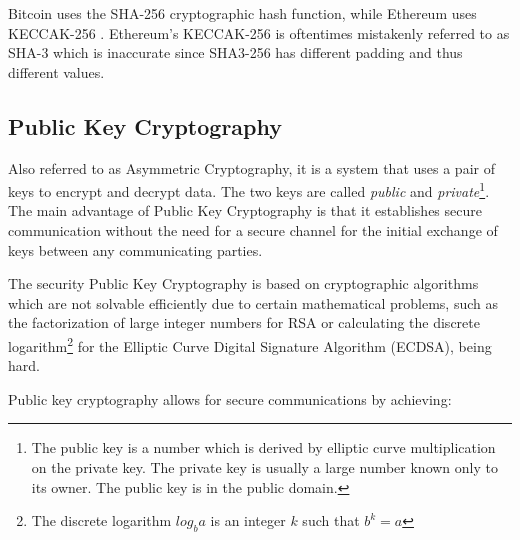 Bitcoin uses the SHA-256 cryptographic hash function, while Ethereum uses KECCAK-256 \cite{btchash, ethash}. Ethereum's KECCAK-256 is oftentimes mistakenly referred to as SHA-3 which is inaccurate since SHA3-256 has different padding and thus different values\cite{sha3}.

\subsection{Public Key Cryptography}
Also referred to as Asymmetric Cryptography, it is a system that uses a pair of keys to encrypt and decrypt data. The two keys are called \textit{public} and \textit{private}\footnote{The public key is a number which is derived by elliptic curve multiplication on the private key. The private key is usually a large number known only to its owner. The public key is in the public domain.}. The main advantage of Public Key Cryptography is that it establishes secure communication without the need for a secure channel for the initial exchange of keys between any communicating parties.

The security Public Key Cryptography is based on cryptographic algorithms which are not solvable efficiently due to certain mathematical problems, such as the factorization of large integer numbers for RSA\cite{Rivest:1978:MOD:359340.359342} or calculating the discrete logarithm\footnote{The discrete logarithm $log_{b}a$ is an integer $k$ such that $b^k = a$} for the Elliptic Curve Digital Signature Algorithm (ECDSA), being hard.

Public key cryptography allows for secure communications by achieving:

